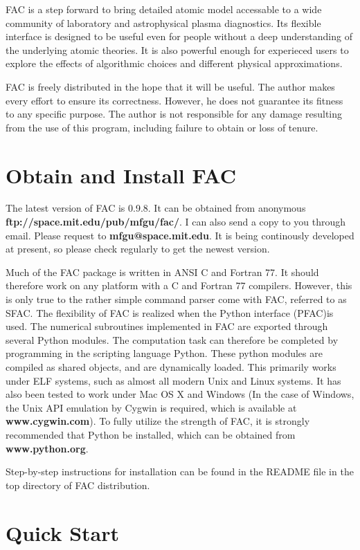 \documentclass[twoside,letterpaper]{refrep}
\newcommand{\facversion}{{0.9.8}\xspace}
\begin{document}
FAC is a step forward to bring detailed atomic model accessable to a wide
community of laboratory and astrophysical plasma diagnostics. Its flexible
interface is designed to be useful even for people without a deep
understanding of the underlying atomic theories. It is also powerful enough
for experieced users to explore the effects of algorithmic choices and
different physical approximations.

FAC is freely distributed in the hope that it will be useful. The author makes
every effort to ensure its correctness. However, he does not guarantee its
fitness to any specific purpose. The author is not responsible for any damage
resulting from the use of this program, including failure to obtain or loss of
tenure. 

\section{Obtain and Install FAC}
\label{sec:install}
The latest version of FAC is \facversion. It can be obtained from anonymous
\textbf{ftp://space.mit.edu/pub/mfgu/fac/}. I can also send a copy to you
through email. Please request to \textbf{mfgu@space.mit.edu}. It is being
continously developed at present, so please check regularly to get the newest
version.

Much of the FAC package is written in ANSI C and Fortran 77. It should 
therefore work on any platform with a C and Fortran 77 compilers. However, 
this is only true to the rather simple command parser come with FAC, referred 
to as SFAC. The flexibility of FAC is realized when the Python interface
(PFAC)is used. The numerical subroutines implemented in FAC are exported
through several Python modules. The computation task can therefore be
completed by programming in the scripting language Python. These python
modules are compiled as shared objects, and are dynamically loaded. This
primarily works under ELF systems, such as almost all modern Unix and Linux
systems. It has also been tested to work under Mac OS X and Windows (In the
case of Windows, the Unix API emulation by Cygwin is required, which is
available at \textbf{www.cygwin.com}). To fully utilize the strength of  
FAC, it is strongly recommended that Python be installed, which can be obtained
from \textbf{www.python.org}.

Step-by-step instructions for installation can be found in the README file in
the top directory of FAC distribution.

\section{Quick Start}
\label{sec:start}
\end{document}
